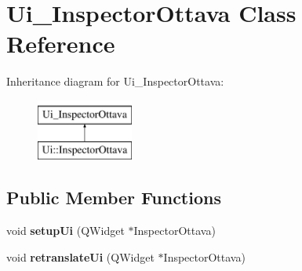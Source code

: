 \hypertarget{class_ui___inspector_ottava}{}\section{Ui\+\_\+\+Inspector\+Ottava Class Reference}
\label{class_ui___inspector_ottava}
Inheritance diagram for Ui\+\_\+\+Inspector\+Ottava\+:\begin{figure}[H]
\begin{center}
\leavevmode
\includegraphics[height=2.000000cm]{class_ui___inspector_ottava}
\end{center}
\end{figure}
\subsection*{Public Member Functions}
\begin{DoxyCompactItemize}
\item 
\mbox{\label{class_ui___inspector_ottava_a896869442ac5f53c906a75f2affa6756}} 
void {\bfseries setup\+Ui} (Q\+Widget $\ast$Inspector\+Ottava)
\item 
\mbox{\label{class_ui___inspector_ottava_a08aa789c3ea4f6b53019a3a667d76092}} 
void {\bfseries retranslate\+Ui} (Q\+Widget $\ast$Inspector\+Ottava)
\end{DoxyCompactItemize}
